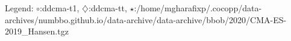 Legend: {\color{NavyBlue}$\circ$}:ddcma-t1, {\color{Magenta}$\diamondsuit$}:ddcma-tt, {\color{Orange}$\star$}:/home/mgharafixp/.cocopp/data-archives/numbbo.github.io/data-archive/data-archive/bbob/2020/CMA-ES-2019\_Hansen.tgz